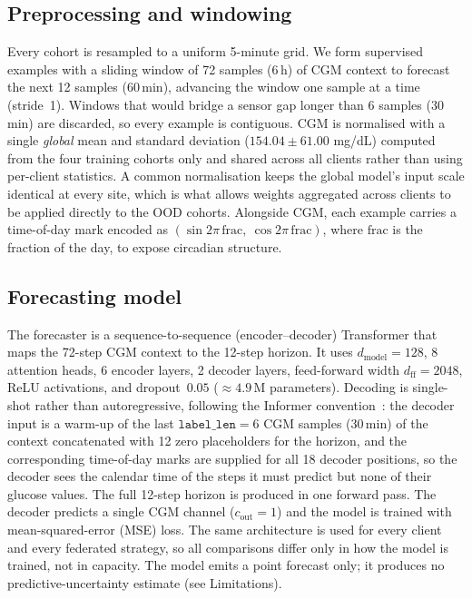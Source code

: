 \documentclass[10pt,letterpaper]{article}
\begin{document}
\subsection*{Preprocessing and windowing}

Every cohort is resampled to a uniform 5-minute grid. We form supervised
examples with a sliding window of 72 samples (6\,h) of CGM context to forecast
the next 12 samples (60\,min), advancing the window one sample at a time
(stride~1). Windows that would bridge a sensor gap longer than 6 samples
(30\,min) are discarded, so every example is contiguous. CGM is normalised with
a single \emph{global} mean and standard deviation ($154.04 \pm 61.00$ mg/dL)
computed from the four training cohorts only and shared
across all clients rather than using per-client statistics. A common
normalisation keeps the global model's input scale identical at every site,
which is what allows weights aggregated across clients to be applied directly to
the OOD cohorts. Alongside CGM,
each example carries a time-of-day mark encoded
as $(\sin 2\pi\,\mathrm{frac},\ \cos 2\pi\,\mathrm{frac})$, where $\mathrm{frac}$
is the fraction of the day, to expose circadian structure.

\subsection*{Forecasting model}

The forecaster is a sequence-to-sequence (encoder--decoder) Transformer that maps
the 72-step CGM context to the 12-step horizon. It uses
$d_{\text{model}}=128$, 8 attention heads, 6 encoder layers, 2 decoder layers,
feed-forward width $d_{\text{ff}}=2048$, ReLU activations, and dropout~$0.05$
($\approx 4.9$\,M parameters). Decoding is single-shot rather than
autoregressive, following the Informer convention~\cite{zhou2021informer}: the
decoder input is a warm-up of the last $\texttt{label\_len}=6$ CGM samples
(30\,min) of the context concatenated with 12 zero placeholders for the horizon,
and the corresponding time-of-day marks are supplied for all 18 decoder
positions, so the decoder sees the calendar time of the steps it must predict but
none of their glucose values. The full 12-step horizon is produced in one forward
pass. The decoder predicts a single CGM channel ($c_{\text{out}}=1$) and the
model is trained with mean-squared-error (MSE) loss. The same architecture is
used for every client and every federated strategy, so all comparisons differ
only in how the model is trained, not in capacity. The model emits a point
forecast only; it produces no predictive-uncertainty estimate (see Limitations).
\end{document}
